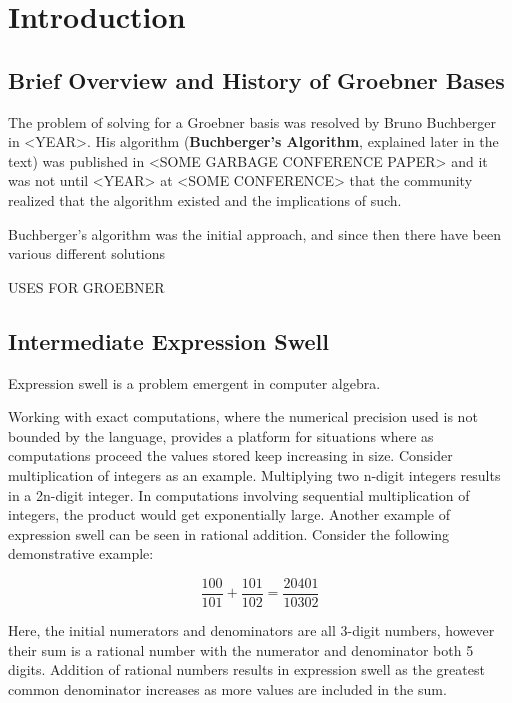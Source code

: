 \documentclass[letterpaper,12pt,titlepage,oneside,final]{book}
\begin{document}
\chapter{Introduction}

\section{Brief Overview and History of Groebner Bases}
 
The problem of solving for a Groebner basis was resolved by Bruno Buchberger in <YEAR>.  His algorithm (\textbf{Buchberger's Algorithm}, explained later in the text) was published in <SOME GARBAGE CONFERENCE PAPER> and it was not until <YEAR> at <SOME CONFERENCE> that the community realized that the algorithm existed and the implications of such.

Buchberger's algorithm was the initial approach, and since then there have been various different solutions 

USES FOR GROEBNER

\section{Intermediate Expression Swell}

Expression swell is a problem emergent in computer algebra.

Working with exact computations, where the numerical precision used is not bounded by the language, provides a platform for situations where as computations proceed the values stored keep increasing in size.  Consider multiplication of integers as an example.  Multiplying two n-digit integers results in a 2n-digit integer.  In computations involving sequential multiplication of integers, the product would get exponentially large.  Another example of expression swell can be seen in rational addition. Consider the following demonstrative example:

\begin{equation*}
  \frac{100}{101} + \frac{101}{102} = \frac{20401}{10302}
\end{equation*}

Here, the initial numerators and denominators are all 3-digit numbers, however their sum is a rational number with the numerator and denominator both 5 digits.  Addition of rational numbers results in expression swell as the greatest common denominator increases as more values are included in the sum.
\end{document}
